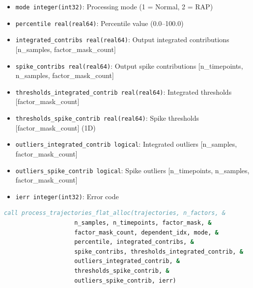 \begin{enumerate}
\begin{enumerate}
\begin{itemize}
                    \item \texttt{mode integer(int32)}: Processing mode (1 = Normal, 2 =
                          RAP)
                          
                    \item \texttt{percentile real(real64)}: Percentile value (0.0--100.0)
                          
                    \item \texttt{integrated\_contribs real(real64)}: Output integrated contributions
                          [n\_samples, factor\_mask\_count]
                          
                    \item \texttt{spike\_contribs real(real64)}: Output spike contributions
                          [n\_timepoints, n\_samples, factor\_mask\_count]
                          
                    \item \texttt{thresholds\_integrated\_contrib real(real64)}: Integrated
                          thresholds [factor\_mask\_count]
                          
                    \item \texttt{thresholds\_spike\_contrib real(real64)}: Spike thresholds
                          [factor\_mask\_count] (1D)
                          
                    \item \texttt{outliers\_integrated\_contrib logical}: Integrated outliers
                          [n\_samples, factor\_mask\_count]
                          
                    \item \texttt{outliers\_spike\_contrib logical}: Spike outliers [n\_timepoints,
                    n\_samples, factor\_mask\_count]
                    
                    \item \texttt{ierr integer(int32)}: Error code
                  \end{itemize}
                  \begin{lstlisting}[language=Fortran, caption={Complete Pipeline with Global Threshold}]
call process_trajectories_flat_alloc(trajectories, n_factors, & 
                    n_samples, n_timepoints, factor_mask, &
                    factor_mask_count, dependent_idx, mode, &
                    percentile, integrated_contribs, &
                    spike_contribs, thresholds_integrated_contrib, &
                    outliers_integrated_contrib, &
                    thresholds_spike_contrib, &
                    outliers_spike_contrib, ierr)
                  \end{lstlisting}
          \end{enumerate}
          

\end{enumerate}
